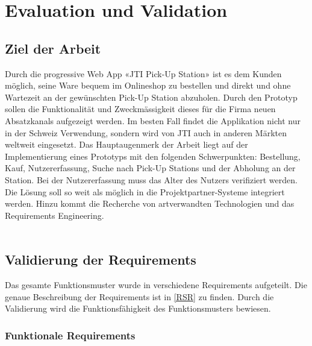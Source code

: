 \section{Evaluation und Validation}\label{Evaluation}
\subsection{Ziel der Arbeit}
Durch die progressive Web App «JTI Pick-Up Station» ist es dem Kunden möglich, seine Ware bequem im Onlineshop zu bestellen und direkt und ohne Wartezeit an der gewünschten Pick-Up Station abzuholen. Durch den Prototyp sollen die Funktionalität und Zweckmässigkeit dieses für die Firma neuen Absatzkanals aufgezeigt werden. Im besten Fall findet die Applikation nicht nur in der Schweiz Verwendung, sondern wird von JTI auch in anderen Märkten weltweit eingesetzt. Das Hauptaugenmerk der Arbeit liegt auf der Implementierung eines Prototyps mit den folgenden Schwerpunkten: Bestellung, Kauf, Nutzererfassung, Suche nach Pick-Up Stations und der Abholung an der Station. Bei der Nutzererfassung muss das Alter des Nutzers verifiziert werden. Die Lösung soll so weit als möglich in die Projektpartner-Systeme integriert werden. Hinzu kommt die Recherche von artverwandten Technologien und das Requirements Engineering. \\\\

\subsection{Validierung der Requirements}
Das gesamte Funktionsmuster wurde in verschiedene Requirements aufgeteilt. Die genaue Beschreibung der Requirements ist in \ref{RSR} zu finden. Durch die Validierung wird die Funktionsfähigkeit des Funktionsmusters bewiesen. 
\subsubsection{Funktionale Requirements}
